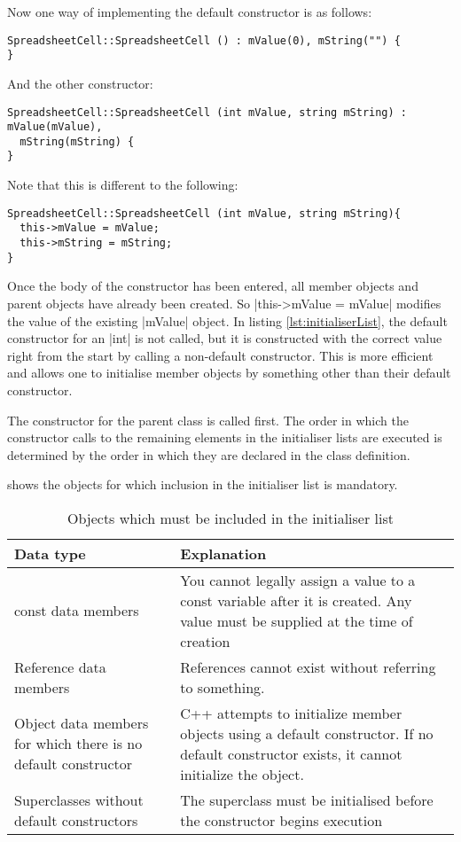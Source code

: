 \documentclass[a4paper,12pt,oneside]{book}
\begin{document}
{Now one way of implementing the default constructor is as follows:
\begin{lstlisting}
SpreadsheetCell::SpreadsheetCell () : mValue(0), mString("") {
}
\end{lstlisting}

And the other constructor:

\begin{lstlisting}[caption={C++ gets it right with the name clash}, label={lst:initialiserList}]
SpreadsheetCell::SpreadsheetCell (int mValue, string mString) : mValue(mValue),
  mString(mString) {
}
\end{lstlisting}

Note that this is different to the following:

\begin{lstlisting}
SpreadsheetCell::SpreadsheetCell (int mValue, string mString){
  this->mValue = mValue;
  this->mString = mString;
}
\end{lstlisting}

Once the body of the constructor has been entered, all member objects and parent objects have already been created. So \lst|this->mValue = mValue| modifies the value of the existing \lst|mValue| object. In listing \ref{lst:initialiserList}, the default constructor for an \lst|int| is not called, but it is constructed with the correct value right from the start by calling a non-default constructor. This is more efficient and allows one to initialise member objects by something other than their default constructor.

The constructor for the parent class is called first. The order in which the constructor calls to the remaining elements in the initialiser lists are executed is determined by the order in which they are declared in the class definition.

 shows the objects for which inclusion in the initialiser list is mandatory.
\begin{table}
  \centering
  \begin{tabulary}{\textwidth}{|L|L|}
    \hline
    {\bf Data type} & {\bf Explanation} \\ \hline
    const data members & You cannot legally assign a value to a const variable after it is created. Any value must be supplied at the time of creation \\ \hline
    Reference data members & References cannot exist without referring to something. \\ \hline
    Object data members for which there is no default constructor & C++ attempts to initialize member objects using a default constructor. If no default constructor exists, it cannot initialize the object. \\ \hline
    Superclasses without default constructors & The superclass must be initialised before the constructor begins execution \\ \hline
  \end{tabulary}
  \caption{Objects which must be included in the initialiser list}
  \label{tab:initialiserMandatory}
\end{table}

}
\end{document}

